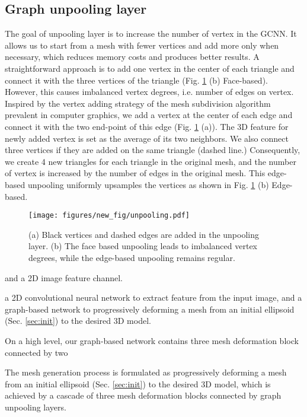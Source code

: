 \documentclass[runningheads]{llncs}
\newcommand{\figref}[1]{Fig. \ref{#1}}
\newcommand{\secref}[1]{Sec. \ref{#1}}
\begin{document}
\subsection{Graph unpooling layer}
The goal of unpooling layer is to increase the number of vertex in the GCNN.
It allows us to start from a mesh with fewer vertices and add more only when necessary, which reduces memory costs and produces better results.
A straightforward approach is to add one vertex in the center of each triangle and connect it with the three vertices of the triangle (\figref{fig:unpooling} (b) Face-based). However, this causes imbalanced vertex degrees, i.e. number of edges on vertex.
Inspired by the vertex adding strategy of the mesh subdivision algorithm prevalent in computer graphics, we add a vertex at the center of each edge and connect it with the two end-point of this edge (\figref{fig:unpooling} (a)). 
The 3D feature for newly added vertex is set as the average of its two neighbors.
We also connect three vertices if they are added on the same triangle (dashed line.)
Consequently, we create 4 new triangles for each triangle in the original mesh, and the number of vertex is increased by the number of edges in the original mesh.
This edge-based unpooling uniformly upsamples the vertices as shown in \figref{fig:unpooling} (b) Edge-based.

\begin{figure}[t]
\centering
\texttt{[image: figures/new\_fig/unpooling.pdf]}
\caption{(a) Black vertices and dashed edges are added in the unpooling layer. (b) The face based unpooling leads to imbalanced vertex degrees, while the edge-based unpooling remains regular.}
\label{fig:unpooling}
\end{figure}


\iffalse
  and a 2D image feature channel.



a 2D convolutional neural network to extract feature from the input image, and a graph-based network to progressively deforming a mesh from an initial ellipsoid (\secref{sec:init}) to the desired 3D model.



On a high level, our graph-based network contains three mesh deformation block connected by two 




The mesh generation process is formulated as progressively deforming a mesh from an initial ellipsoid (\secref{sec:init}) to the desired 3D model, which is achieved by a cascade of three mesh deformation blocks connected by graph unpooling layers.
\end{document}
